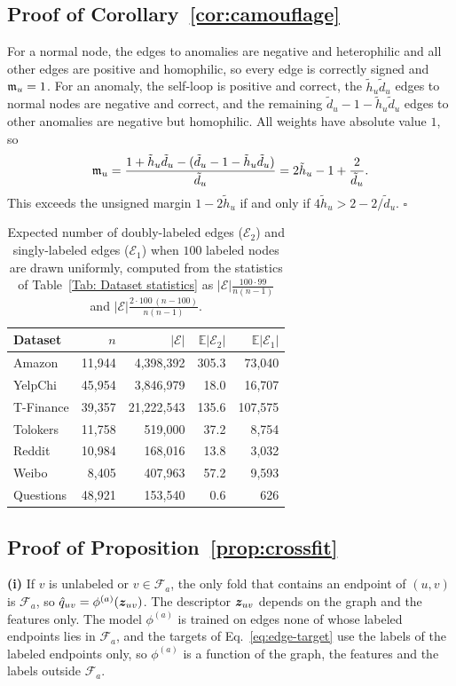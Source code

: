 \subsection{Proof of Corollary~\ref{cor:camouflage}}
For a normal node, the edges to anomalies are negative and heterophilic and all other edges are positive and homophilic, so every edge is correctly signed and $\mathfrak{m}_u=1$.
For an anomaly, the self-loop is positive and correct, the $\tilde h_u\tilde d_u$ edges to normal nodes are negative and correct, and the remaining $\tilde d_u-1-\tilde h_u\tilde d_u$ edges to other anomalies are negative but homophilic.
All weights have absolute value $1$, so
\[
\mathfrak{m}_u=\frac{1+\tilde h_u\tilde d_u-(\tilde d_u-1-\tilde h_u\tilde d_u)}{\tilde d_u}=2\tilde h_u-1+\frac{2}{\tilde d_u}.
\]
This exceeds the unsigned margin $1-2\tilde h_u$ if and only if $4\tilde h_u>2-2/\tilde d_u$.
\hfill$\square$

\begin{table}[h]
\centering
\caption{Expected number of doubly-labeled edges ($\mathcal E_2$) and singly-labeled edges ($\mathcal E_1$) when $100$ labeled nodes are drawn uniformly, computed from the statistics of Table~\ref{Tab: Dataset statistics} as $|\mathcal E|\tfrac{100\cdot99}{n(n-1)}$ and $|\mathcal E|\tfrac{2\cdot100\,(n-100)}{n(n-1)}$.}
\label{tab:e2size}
\small
\begin{tabular}{lrrrr}
\toprule
Dataset & $n$ & $|\mathcal E|$ & $\mathbb E|\mathcal E_2|$ & $\mathbb E|\mathcal E_1|$ \\
\midrule
Amazon & 11,944 & 4,398,392 & 305.3 & 73,040 \\
YelpChi & 45,954 & 3,846,979 & 18.0 & 16,707 \\
T-Finance & 39,357 & 21,222,543 & 135.6 & 107,575 \\
Tolokers & 11,758 & 519,000 & 37.2 & 8,754 \\
Reddit & 10,984 & 168,016 & 13.8 & 3,032 \\
Weibo & 8,405 & 407,963 & 57.2 & 9,593 \\
Questions & 48,921 & 153,540 & 0.6 & 626 \\
\bottomrule
\end{tabular}
\end{table}

\subsection{Proof of Proposition~\ref{prop:crossfit}}
\textbf{(i)} If $v$ is unlabeled or $v\in\mathcal F_a$, the only fold that contains an endpoint of $(u,v)$ is $\mathcal F_a$, so $\hat q_{uv}=\phi^{(a)}(\bm{z}_{uv})$.
The descriptor $\bm{z}_{uv}$ depends on the graph and the features only.
The model $\phi^{(a)}$ is trained on edges none of whose labeled endpoints lies in $\mathcal F_a$, and the targets of Eq.~\eqref{eq:edge-target} use the labels of the labeled endpoints only, so $\phi^{(a)}$ is a function of the graph, the features and the labels outside $\mathcal F_a$.

